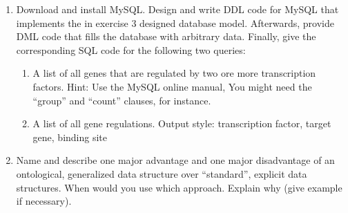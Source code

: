 \documentclass[a4paper,10pt,titlepage]{article}
\begin{document}
\begin{enumerate}
\item
Download and install MySQL. Design and write DDL code for MySQL that implements the in exercise 3 designed database model. Afterwards, provide DML code that fills the database with arbitrary data. Finally, give the corresponding 
SQL code for the following two queries:
\begin{enumerate}
\item
A list of all genes that are regulated by two ore more transcription factors. Hint: Use the MySQL online manual, You might need the “group” and “count” clauses, for instance.
\item
A list of all gene regulations. Output style: transcription factor, target gene, binding site
\end{enumerate}

\item
Name and describe one major advantage and one major disadvantage of an ontological, generalized data structure over 
“standard”, explicit data structures. When would you use which approach. Explain why (give example if necessary).
\end{enumerate}
\end{document}
